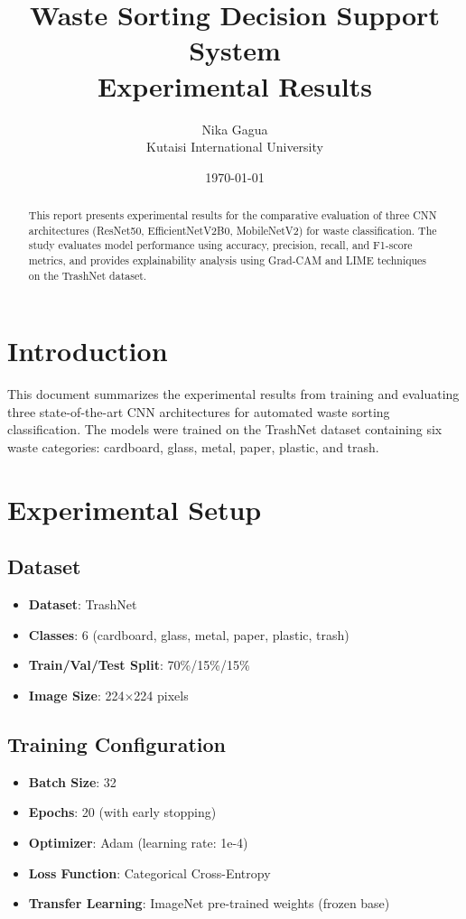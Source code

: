 \documentclass[11pt,a4paper]{article}
\title{Waste Sorting Decision Support System\\Experimental Results}
\author{Nika Gagua\\Kutaisi International University}
\date{\today}
\begin{document}
\maketitle

\begin{abstract}
This report presents experimental results for the comparative evaluation of three CNN architectures (ResNet50, EfficientNetV2B0, MobileNetV2) for waste classification. The study evaluates model performance using accuracy, precision, recall, and F1-score metrics, and provides explainability analysis using Grad-CAM and LIME techniques on the TrashNet dataset.
\end{abstract}

\section{Introduction}

This document summarizes the experimental results from training and evaluating three state-of-the-art CNN architectures for automated waste sorting classification. The models were trained on the TrashNet dataset containing six waste categories: cardboard, glass, metal, paper, plastic, and trash.

\section{Experimental Setup}

\subsection{Dataset}
\begin{itemize}
    \item \textbf{Dataset}: TrashNet
    \item \textbf{Classes}: 6 (cardboard, glass, metal, paper, plastic, trash)
    \item \textbf{Train/Val/Test Split}: 70\%/15\%/15\%
    \item \textbf{Image Size}: 224$\times$224 pixels
\end{itemize}

\subsection{Training Configuration}
\begin{itemize}
    \item \textbf{Batch Size}: 32
    \item \textbf{Epochs}: 20 (with early stopping)
    \item \textbf{Optimizer}: Adam (learning rate: 1e-4)
    \item \textbf{Loss Function}: Categorical Cross-Entropy
    \item \textbf{Transfer Learning}: ImageNet pre-trained weights (frozen base)
\end{itemize}
\end{document}
